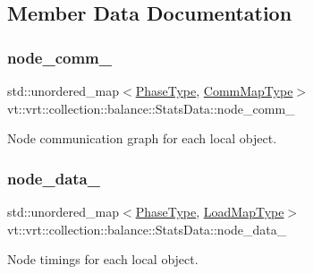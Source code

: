 \subsection{Member Data Documentation}
\mbox{\label{structvt_1_1vrt_1_1collection_1_1balance_1_1_stats_data_a5ee2aea35e48a4855c8f99c16b588287}} 
\subsubsection{\texorpdfstring{node\+\_\+comm\+\_\+}{node\_comm\_}}
{\footnotesize\ttfamily std\+::unordered\+\_\+map$<$\hyperlink{namespacevt_a46ce6733d5cdbd735d561b7b4029f6d7}{Phase\+Type}, \hyperlink{namespacevt_1_1vrt_1_1collection_1_1balance_a10860c956804d644db54a16012352728}{Comm\+Map\+Type}$>$ vt\+::vrt\+::collection\+::balance\+::\+Stats\+Data\+::node\+\_\+comm\+\_\+}



Node communication graph for each local object. 

\mbox{\label{structvt_1_1vrt_1_1collection_1_1balance_1_1_stats_data_a34a782537ef1b33bfc1c7b1f635e1c72}} 
\subsubsection{\texorpdfstring{node\+\_\+data\+\_\+}{node\_data\_}}
{\footnotesize\ttfamily std\+::unordered\+\_\+map$<$\hyperlink{namespacevt_a46ce6733d5cdbd735d561b7b4029f6d7}{Phase\+Type}, \hyperlink{namespacevt_1_1vrt_1_1collection_1_1balance_a824290c4323836ba7541a39845a200c3}{Load\+Map\+Type}$>$ vt\+::vrt\+::collection\+::balance\+::\+Stats\+Data\+::node\+\_\+data\+\_\+}



Node timings for each local object. 

